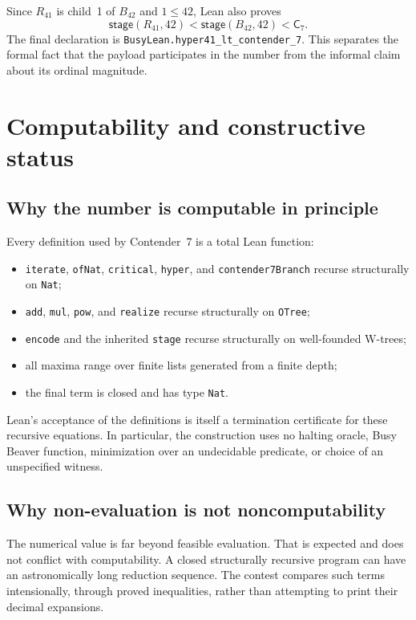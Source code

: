 \documentclass[11pt]{article}
\theoremstyle{definition}
\theoremstyle{remark}
\newcommand{\Stage}{\ensuremath{\mathsf{stage}}}
\newcommand{\Cseven}{\ensuremath{\mathsf{C}_7}}
\newcommand{\lean}[1]{\texttt{#1}}
\begin{document}
Since $R_{41}$ is child~1 of $B_{42}$ and $1\le42$, Lean also proves
\[
  \Stage(R_{41},42)<\Stage(B_{42},42)<\Cseven.
\]
The final declaration is \lean{BusyLean.hyper41\_lt\_contender\_7}.  This
separates the formal fact that the payload participates in the number from the
informal claim about its ordinal magnitude.

\section{Computability and constructive status}

\subsection{Why the number is computable in principle}

Every definition used by Contender~7 is a total Lean function:

\begin{itemize}[leftmargin=*]
\item \lean{iterate}, \lean{ofNat}, \lean{critical}, \lean{hyper}, and
  \lean{contender7Branch} recurse structurally on \lean{Nat};
\item \lean{add}, \lean{mul}, \lean{pow}, and \lean{realize} recurse
  structurally on \lean{OTree};
\item \lean{encode} and the inherited \lean{stage} recurse structurally on
  well-founded W-trees;
\item all maxima range over finite lists generated from a finite depth;
\item the final term is closed and has type \lean{Nat}.
\end{itemize}

Lean's acceptance of the definitions is itself a termination certificate for
these recursive equations.  In particular, the construction uses no halting
oracle, Busy Beaver function, minimization over an undecidable predicate, or
choice of an unspecified witness.

\subsection{Why non-evaluation is not noncomputability}

The numerical value is far beyond feasible evaluation.  That is expected and
does not conflict with computability.  A closed structurally recursive program
can have an astronomically long reduction sequence.  The contest compares such
terms intensionally, through proved inequalities, rather than attempting to
print their decimal expansions.
\end{document}
